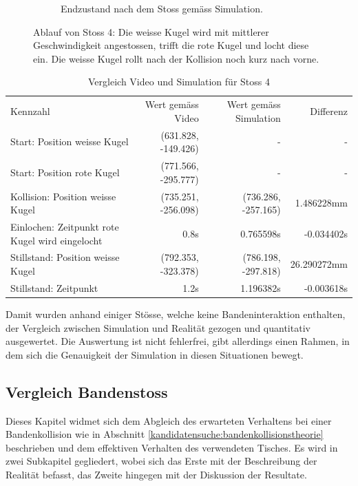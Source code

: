 \begin{figure}[h!]
\begin{subfigure}[t]{0.2\textwidth}
        \caption{Endzustand nach dem Stoss gemäss Simulation.}
        \label{fig:video_13_0030_0034_simulation}
    \end{subfigure}
    \caption{
        Ablauf von Stoss 4: Die weisse Kugel wird mit mittlerer Geschwindigkeit angestossen, trifft die rote Kugel und locht diese ein.
        Die weisse Kugel rollt nach der Kollision noch kurz nach vorne.
    }
    \label{fig:video_13_0030_0034}
\end{figure}

\begin{table}[ht]
    \begin{tabular}{ lrrr }
        \rowcolor{\seccolor!50}
        Kennzahl & Wert gemäss Video & Wert gemäss Simulation & Differenz \\
        Start: Position weisse Kugel & (631.828, -149.426) & - & -\\
        Start: Position rote Kugel & (771.566, -295.777) & - & -\\
        Kollision: Position weisse Kugel & (735.251, -256.098) & (736.286, -257.165) & 1.486228mm\\
        Einlochen: Zeitpunkt rote Kugel wird eingelocht & 0.8s & 0.765598s & -0.034402s\\
        Stillstand: Position weisse Kugel & (792.353, -323.378) & (786.198, -297.818) & 26.290272mm\\
        Stillstand: Zeitpunkt & 1.2s & 1.196382s & -0.003618s\\
    \end{tabular}
    \caption{Vergleich Video und Simulation für Stoss 4}
    \label{tab:video_13_0030_0034}
\end{table}

Damit wurden anhand einiger Stösse, welche keine Bandeninteraktion enthalten,
der Vergleich zwischen Simulation und Realität gezogen und quantitativ ausgewertet.
Die Auswertung ist nicht fehlerfrei, gibt allerdings einen Rahmen, in dem sich die Genauigkeit der Simulation in diesen
Situationen bewegt.

\newpage
\subsection{Vergleich Bandenstoss}\label{kap:vergleich_simulation_realitaet:vergleich_bandenstoss}
Dieses Kapitel widmet sich dem Abgleich des erwarteten Verhaltens bei einer Bandenkollision wie in
Abschnitt \ref{kandidatensuche:bandenkollisionstheorie} beschrieben und dem effektiven Verhalten des verwendeten Tisches.
Es wird in zwei Subkapitel gegliedert, wobei sich das Erste mit der Beschreibung der Realität befasst, das Zweite hingegen
mit der Diskussion der Resultate.

